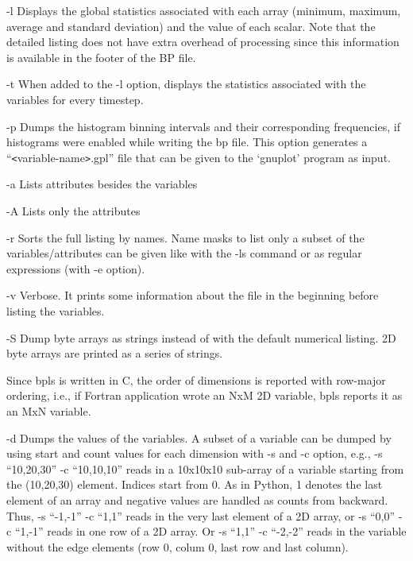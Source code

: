 \vspace{10pt}
\leftskip=36pt
\parindent=-36pt
-l  Displays the global statistics associated with each array (minimum, maximum, 
average and standard deviation) and the value of each scalar. Note that the detailed 
listing does not have extra overhead of processing since this information is available 
in the footer of the BP file. 

\vspace{10pt}
-t  When added to the -l option, displays the statistics associated with the variables 
for every timestep. 

\vspace{10pt}
-p Dumps the histogram binning intervals and their corresponding frequencies, if 
histograms were enabled while writing the bp file. This option generates a ``\texttt{<}variable-name\texttt{>}.gpl'' 
file that can be given to the `gnuplot' program as input. 

\vspace{10pt}
-a Lists attributes besides the variables

\vspace{10pt}
-A Lists only the attributes

\vspace{10pt}
-r Sorts the full listing by names. Name masks to list only a subset of the variables/attributes 
can be given like with the -ls command or as regular expressions (with -e option).

\vspace{10pt}
-v Verbose. It prints some information about the file in the beginning before listing 
the variables. 

\vspace{10pt}
-S Dump byte arrays as strings instead of with the default numerical listing. 2D 
byte arrays are printed as a series of strings. 

\vspace{10pt}
\leftskip=0pt
\parindent=0pt
Since bpls is written in C, the order of dimensions is reported with row-major 
ordering, i.e., if Fortran application wrote an NxM 2D variable, bpls reports it 
as an MxN variable. 

\vspace{10pt}
\leftskip=36pt
\parindent=-36pt
-d Dumps the values of the variables. A subset of a variable can be dumped by using 
start and count values for each dimension with -s and -c option, e.g., -s ``10,20,30'' 
-c ``10,10,10'' reads in a 10x10x10 sub-array of a variable starting from the (10,20,30) 
element. Indices start from 0. As in Python, \-{}1 denotes the last element of 
an array and negative values are handled as counts from backward. Thus, -s ``-1,-1'' 
-c ``1,1'' reads in the very last element of a 2D array, or -s ``0,0'' -c ``1,-1'' 
reads in one row of a 2D array. Or -s ``1,1'' -c ``-2,-2'' reads in the variable 
without the edge elements (row 0, colum 0, last row and last column).

